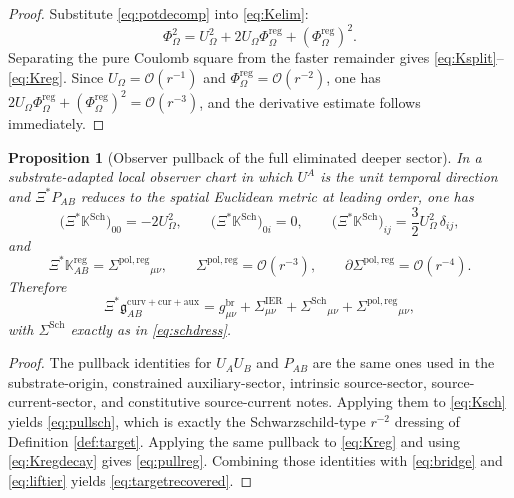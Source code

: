 \documentclass[11pt]{article}
\newcommand{\BridgeMetric}{\mathfrak g}
\newcommand{\ObserverMap}{\Xi}
\newcommand{\ProjSub}{P}
\newcommand{\FlowPot}{\Phi_\Omega}
\newcommand{\FlowPotReg}{\Phi_\Omega^{\mathrm{reg}}}
\newcommand{\CoulPot}{U_\Omega}
\newcommand{\SigmaIER}{\Sigma^{\mathrm{IER}}}
\newcommand{\SigmaDressSch}{\Sigma^{\mathrm{Sch}}}
\newcommand{\SigmaRegPol}{\Sigma^{\mathrm{pol,reg}}}
\newcommand{\AuxPol}{\mathbb K}
\newtheorem{proposition}{Proposition}
\begin{document}
\begin{proof}
Substitute \eqref{eq:potdecomp} into \eqref{eq:Kelim}:
\[
\FlowPot^2=\CoulPot^2+2\CoulPot\FlowPotReg+(\FlowPotReg)^2.
\]
Separating the pure Coulomb square from the faster remainder gives \eqref{eq:Ksplit}--\eqref{eq:Kreg}. Since \(\CoulPot=\mathcal O(r^{-1})\) and \(\FlowPotReg=\mathcal O(r^{-2})\), one has \(2\CoulPot\FlowPotReg+(\FlowPotReg)^2=\mathcal O(r^{-3})\), and the derivative estimate follows immediately.
\end{proof}

\begin{proposition}[Observer pullback of the full eliminated deeper sector]
\label{prop:pullback}
In a substrate-adapted local observer chart in which \(U^A\) is the unit temporal direction and \(\ObserverMap^\ast\ProjSub_{AB}\) reduces to the spatial Euclidean metric at leading order, one has
\begin{equation}
\bigl(\ObserverMap^\ast\AuxPol^{\mathrm{Sch}}\bigr)_{00}
=
-2\CoulPot^2,
\qquad
\bigl(\ObserverMap^\ast\AuxPol^{\mathrm{Sch}}\bigr)_{0i}
=
0,
\qquad
\bigl(\ObserverMap^\ast\AuxPol^{\mathrm{Sch}}\bigr)_{ij}
=
\frac32\CoulPot^2\,\delta_{ij},
\label{eq:pullsch}
\end{equation}
and
\begin{equation}
\ObserverMap^\ast\AuxPol_{AB}^{\mathrm{reg}}
=
\SigmaRegPol{}_{\mu\nu},
\qquad
\SigmaRegPol=\mathcal O(r^{-3}),
\qquad
\partial\SigmaRegPol=\mathcal O(r^{-4}).
\label{eq:pullreg}
\end{equation}
Therefore
\begin{equation}
\ObserverMap^\ast \BridgeMetric_{AB}^{\mathrm{curv+cur+aux}}
=
g_{\mu\nu}^{\mathrm{br}}
+\SigmaIER_{\mu\nu}
+\SigmaDressSch{}_{\mu\nu}
+\SigmaRegPol{}_{\mu\nu},
\label{eq:targetrecovered}
\end{equation}
with \(\SigmaDressSch\) exactly as in \eqref{eq:schdress}.
\end{proposition}

\begin{proof}
The pullback identities for \(U_AU_B\) and \(\ProjSub_{AB}\) are the same ones used in the substrate-origin, constrained auxiliary-sector, intrinsic source-sector, source-current-sector, and constitutive source-current notes. Applying them to \eqref{eq:Ksch} yields \eqref{eq:pullsch}, which is exactly the Schwarzschild-type \(r^{-2}\) dressing of Definition \ref{def:target}. Applying the same pullback to \eqref{eq:Kreg} and using \eqref{eq:Kregdecay} gives \eqref{eq:pullreg}. Combining those identities with \eqref{eq:bridge} and \eqref{eq:liftier} yields \eqref{eq:targetrecovered}.
\end{proof}
\end{document}
